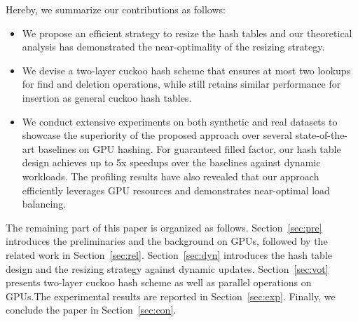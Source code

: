 
Hereby, we summarize our contributions as follows:
\begin{itemize}
	\item We propose an efficient strategy to resize the hash tables and our theoretical analysis has demonstrated the near-optimality of the resizing strategy.
	\item We devise a two-layer cuckoo hash scheme that ensures at most two lookups for find and deletion operations, while still retains similar performance for insertion as general cuckoo hash tables. 
	\item We conduct extensive experiments on both synthetic and real datasets to showcase the superiority of the proposed approach over several state-of-the-art baselines on GPU hashing. 
	For guaranteed filled factor, our hash table design achieves up to 5x speedups over the baselines against dynamic workloads. The profiling results have also revealed that our approach efficiently leverages GPU resources and demonstrates near-optimal load balancing. 
\end{itemize}

The remaining part of this paper is organized as follows. Section~\ref{sec:pre} introduces the preliminaries and the background on GPUs, followed by the related work in Section~\ref{sec:rel}. Section~\ref{sec:dyn} introduces the hash table design and the resizing strategy against dynamic updates.
Section~\ref{sec:vot} presents two-layer cuckoo hash scheme as well as parallel operations on GPUs.The experimental results are reported in Section~\ref{sec:exp}. Finally, we conclude the paper in Section~\ref{sec:con}.